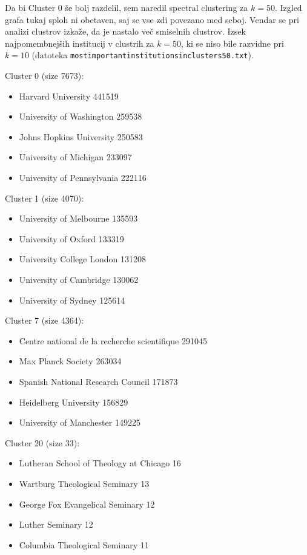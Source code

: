 \documentclass[a4paper,12pt]{article}
\begin{document}
	Da bi Cluster 0 še bolj razdelil, sem naredil spectral clustering za $k = 50$. Izgled grafa tukaj sploh ni obetaven, saj se vse zdi povezano med seboj. Vendar se pri analizi clustrov izkaže, da je nastalo več smiselnih clustrov. Izsek najpomembnejših institucij v clustrih za $k=50$, ki se niso bile razvidne pri $k=10$ (datoteka \texttt{most\textunderscore important\textunderscore institutions\textunderscore in\textunderscore clusters\textunderscore 50.txt}).
	
	\hspace{1cm}
	
	Cluster 0 (size 7673):
	\begin{itemize}
		\item Harvard University 441519
		\item University of Washington 259538
		\item Johns Hopkins University 250583
		\item University of Michigan 233097
		\item University of Pennsylvania 222116
	\end{itemize}
	
	\pagebreak
	
	Cluster 1 (size 4070):
	\begin{itemize}
		\item University of Melbourne 135593
		\item University of Oxford 133319
		\item University College London 131208
		\item University of Cambridge 130062
		\item University of Sydney 125614
	\end{itemize}
	
	\hspace{1cm}
	
	Cluster 7 (size 4364):
	\begin{itemize}
		\item Centre national de la recherche scientifique 291045
		\item Max Planck Society 263034
		\item Spanish National Research Council 171873
		\item Heidelberg University 156829
		\item University of Manchester 149225
	\end{itemize}

	Cluster 20 (size 33):
	\begin{itemize}
		\item Lutheran School of Theology at Chicago 16
		\item Wartburg Theological Seminary 13
		\item George Fox Evangelical Seminary 12
		\item Luther Seminary 12
		\item Columbia Theological Seminary 11
	\end{itemize}
\end{document}
